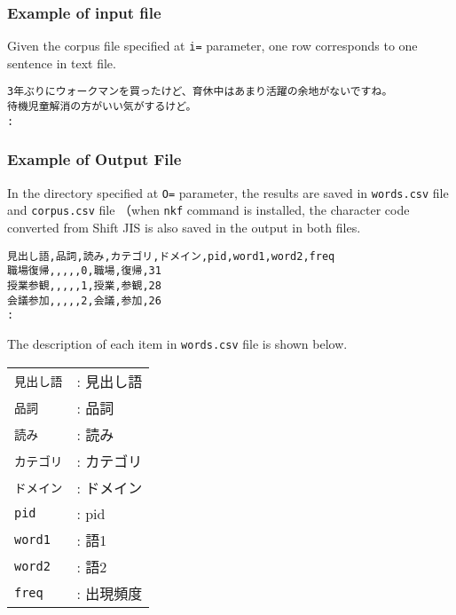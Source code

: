 \subsubsection*{Example of input file }

Given the corpus file specified at \verb|i=| parameter, one row corresponds to one sentence in text file. 


\begin{Verbatim}[baselinestretch=0.7,frame=single]
3年ぶりにウォークマンを買ったけど、育休中はあまり活躍の余地がないですね。
待機児童解消の方がいい気がするけど。
:
\end{Verbatim}

\subsubsection*{Example of Output File  }

In the directory specified at \verb|O=| parameter, 
the results are saved in \verb|words.csv| file and  \verb|corpus.csv| file  （when \verb|nkf| command is installed,  the character code converted from Shift JIS is also saved in the output in both files. 
 
\begin{Verbatim}[baselinestretch=0.7,frame=single]
見出し語,品詞,読み,カテゴリ,ドメイン,pid,word1,word2,freq
職場復帰,,,,,0,職場,復帰,31
授業参観,,,,,1,授業,参観,28
会議参加,,,,,2,会議,参加,26
:
\end{Verbatim}

\newpage

The description of each item in \verb|words.csv| file is shown below.  

\begin{table}[htbp]
{\small
\begin{tabular}{ll}
\verb|見出し語| & : 見出し語 \\  
\verb|品詞|     & : 品詞 \\  
\verb|読み|     & : 読み \\  
\verb|カテゴリ| & : カテゴリ \\  
\verb|ドメイン| & : ドメイン \\  
\verb|pid|      & : pid \\  
\verb|word1|    & : 語1 \\  
\verb|word2|    & : 語2 \\  
\verb|freq|     & : 出現頻度 \\  
\end{tabular} 
}
\end{table} 


